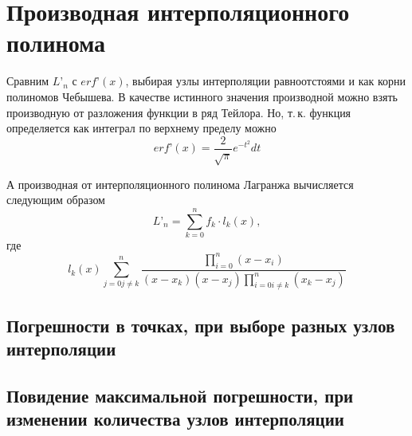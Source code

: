 \section{Производная интерполяционного полинома}
Сравним $L’_n$ с $erf’(x)$, выбирая узлы интерполяции равноотстоями и как корни полиномов Чебышева. В качестве истинного значения производной можно взять производную от разложения функции в ряд Тейлора. Но, т.\,к. функция определяется как интеграл по верхнему пределу можно
$$
	erf’(x) =  \frac{2}{\sqrt{\pi}}e^{-t^2}dt
$$

А производная от интерполяционного полинома Лагранжа вычисляется следующим образом
$$
	L’_n = \sum\limits_{k=0}^{n} f_k\cdot l_k(x),
$$
где
$$
	l_k(x) \sum\limits_{j=0 j\neq k}^{n}\frac{\prod\limits_{i=0}^{n}(x-x_i)}{(x-x_k)(x-x_j)\prod\limits_{i=0 i\neq k}^{n}(x_k-x_j)}
$$


\subsection{Погрешности в точках, при выборе разных узлов интерполяции}


\subsection{Повидение максимальной погрешности, при изменении количества узлов интерполяции}
